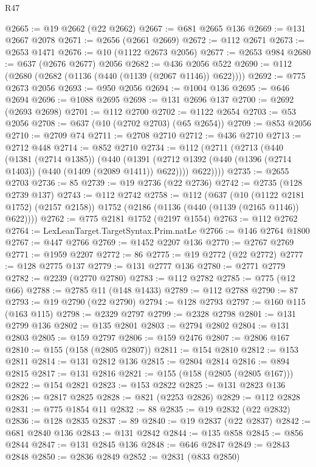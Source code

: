 \begin{lexlean}{R47}
\begin{coremodule}
@2665 := @19 @2662 (@22 @2662)
@2667 := @681 @2665 @136
@2669 := @131 @2667 @2078
@2671 := @2656 (@2661 @2669)
@2672 := @112 @2671
@2673 := @2653 @1471
@2676 := @10 (@1122 @2673 @2056)
@2677 := @2653 @984
@2680 := @637 (@2676 @2677) @2056
@2682 := @436 @2056 @522
@2690 := @112 (@2680 (@2682 (@1136 (@440 (@1139 (@2067 @1146)) @622))))
@2692 := @775 @2673 @2056
@2693 := @950 @2056
@2694 := @1004 @136
@2695 := @646 @2694
@2696 := @1088 @2695
@2698 := @131 @2696 @137
@2700 := @2692 (@2693 @2698)
@2701 := @112 @2700
@2702 := @1122 @2654
@2703 := @53 @2056
@2708 := @637 (@10 (@2702 @2703) (@65 @2654))
@2709 := @853 @2056
@2710 := @2709 @74
@2711 := @2708 @2710
@2712 := @436 @2710
@2713 := @2712 @448
@2714 := @852 @2710
@2734 := @112
    (@2711
      (@2713
        (@440
          (@1381 (@2714 @1385))
          (@440
            (@1391 (@2712 @1392 (@440 (@1396 (@2714 @1403)) (@440 (@1409 (@2089 @1411)) @622))))
            @622))))
@2735 := @2655 @2703
@2736 := 85
@2739 := @19 @2736 (@22 @2736)
@2742 := @2735 (@128 @2739 @137)
@2743 := @112 @2742
@2758 := @112
    (@637
      (@10 (@1122 @2181 @1752) (@2157 @2158))
      @1752
      (@2186 (@1136 (@440 (@1139 (@2165 @1146)) @622))))
@2762 := @775 @2181 @1752 (@2197 @1554)
@2763 := @112 @2762
@2764 := LexLeanTarget.TargetSyntax.Prim.natLe
@2766 := @146 @2764 @1800
@2767 := @447 @2766
@2769 := @1452 @2207 @136
@2770 := @2767 @2769
@2771 := @1959 @2207
@2772 := 86
@2775 := @19 @2772 (@22 @2772)
@2777 := @128 @2775 @137
@2779 := @131 @2777 @136
@2780 := @2771 @2779
@2782 := @2239 (@2770 @2780)
@2783 := @112 @2782
@2785 := @775 (@12 @66)
@2788 := @2785 @11 (@148 @1433)
@2789 := @112 @2788
@2790 := 87
@2793 := @19 @2790 (@22 @2790)
@2794 := @128 @2793
@2797 := @160 @115 (@163 @115)
@2798 := @2329 @2797
@2799 := @2328 @2798
@2801 := @131 @2799 @136
@2802 := @135 @2801
@2803 := @2794 @2802
@2804 := @131 @2803
@2805 := @159 @2797
@2806 := @159 @2476
@2807 := @2806 @167
@2810 := @155 (@158 (@2805 @2807))
@2811 := @154 @2810
@2812 := @153 @2811
@2814 := @131 @2812 @136
@2815 := @2804 @2814
@2816 := @894 @2815
@2817 := @131 @2816
@2821 := @155 (@158 (@2805 (@2805 @167)))
@2822 := @154 @2821
@2823 := @153 @2822
@2825 := @131 @2823 @136
@2826 := @2817 @2825
@2828 := @821 (@2253 @2826)
@2829 := @112 @2828
@2831 := @775 @1854 @11
@2832 := 88
@2835 := @19 @2832 (@22 @2832)
@2836 := @128 @2835
@2837 := 89
@2840 := @19 @2837 (@22 @2837)
@2842 := @681 @2840 @136
@2843 := @131 @2842
@2844 := @135 @858
@2845 := @856 @2844
@2847 := @131 @2845 @136
@2848 := @646 @2847
@2849 := @2843 @2848
@2850 := @2836 @2849
@2852 := @2831 (@833 @2850)

\end{coremodule}
\end{lexlean}
